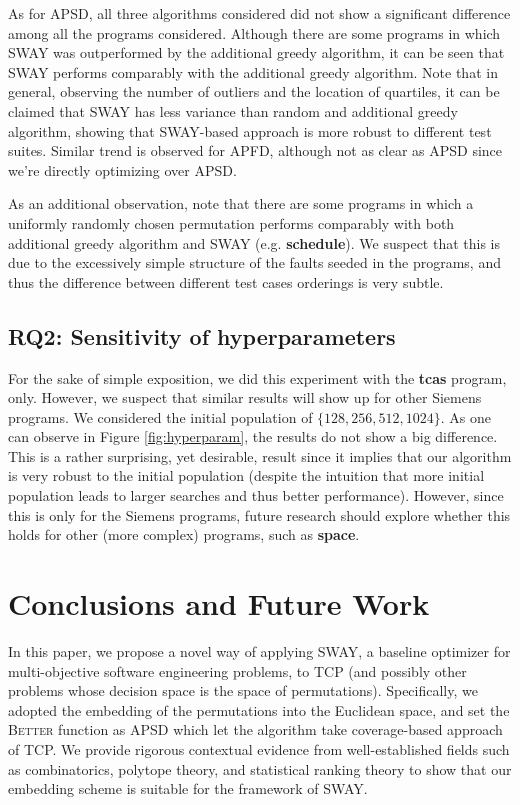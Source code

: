 \documentclass[10pt,journal,compsoc]{IEEEtran}
\begin{document}
	As for APSD, all three algorithms considered did not show a significant difference among all the programs considered.
	Although there are some programs in which SWAY was outperformed by the additional greedy algorithm, it can be seen that SWAY performs comparably with the additional greedy algorithm.
	Note that in general, observing the number of outliers and the location of quartiles, it can be claimed that SWAY has less variance than random and additional greedy algorithm, showing that SWAY-based approach is more robust to different test suites.
	Similar trend is observed for APFD, although not as clear as APSD since we're directly optimizing over APSD.
	
	As an additional observation, note that there are some programs in which a uniformly randomly chosen permutation performs comparably with both additional greedy algorithm and SWAY (e.g. {\bf schedule}).
	We suspect that this is due to the excessively simple structure of the faults seeded in the programs, and thus the difference between different test cases orderings is very subtle.
	
	
	\subsection{RQ2: Sensitivity of hyperparameters}
	For the sake of simple exposition, we did this experiment with the {\bf tcas} program, only. However, we suspect that similar results will show up for other Siemens programs.
	We considered the initial population of $\{128, 256, 512, 1024\}$. As one can observe in Figure \ref{fig:hyperparam}, the results do not show a big difference.
	This is a rather surprising, yet desirable, result since it implies that our algorithm is very robust to the initial population (despite the intuition that more initial population leads to larger searches and thus better performance).
	However, since this is only for the Siemens programs, future research should explore whether this holds for other (more complex) programs, such as {\bf space}\cite{space}.
	
	
	\section{Conclusions and Future Work}
	In this paper, we propose a novel way of applying SWAY, a  baseline optimizer for multi-objective software engineering problems, to TCP (and possibly other problems whose decision space is the space of permutations).
	Specifically, we adopted the embedding of the permutations into the Euclidean space, and set the \textsc{Better} function as APSD which let the algorithm take coverage-based approach of TCP.
	We provide rigorous contextual evidence from well-established fields such as combinatorics, polytope theory, and statistical ranking theory to show that our embedding scheme is suitable for the framework of SWAY.
	
\end{document}
